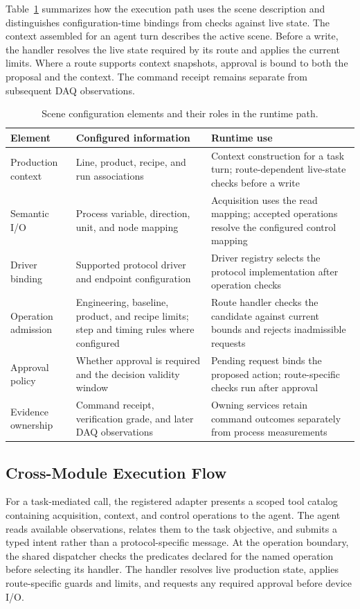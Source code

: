\documentclass[journal]{IEEEtran}
\begin{document}
Table~\ref{tab:scene-config} summarizes how the execution path uses the scene
description and distinguishes configuration-time bindings from checks against
live state. The context assembled for an agent turn describes the active scene. Before a
write, the handler resolves the live state required by its route and applies
the current limits. Where a route supports context snapshots, approval is
bound to both the proposal and the context. The command receipt remains
separate from subsequent DAQ observations.

\begin{table}[!t]
\centering
\caption{Scene configuration elements and their roles in the runtime path.}
\label{tab:scene-config}
\footnotesize
\setlength{\tabcolsep}{5pt}
\begin{tabularx}{\textwidth}{@{}>{\raggedright\arraybackslash}p{}>{\raggedright\arraybackslash}p{}X@{}}
\toprule
Element & Configured information & Runtime use\\
\midrule
Production context & Line, product, recipe, and run associations & Context construction for a task turn; route-dependent live-state checks before a write\\
Semantic I/O & Process variable, direction, unit, and node mapping & Acquisition uses the read mapping; accepted operations resolve the configured control mapping\\
Driver binding & Supported protocol driver and endpoint configuration & Driver registry selects the protocol implementation after operation checks\\
Operation admission & Engineering, baseline, product, and recipe limits; step and timing rules where configured & Route handler checks the candidate against current bounds and rejects inadmissible requests\\
Approval policy & Whether approval is required and the decision validity window & Pending request binds the proposed action; route-specific checks run after approval\\
Evidence ownership & Command receipt, verification grade, and later DAQ observations & Owning services retain command outcomes separately from process measurements\\
\bottomrule
\end{tabularx}
\end{table}

\subsection{Cross-Module Execution Flow}
\label{sec:executionflow}
For a task-mediated call, the registered adapter presents a scoped tool
catalog containing acquisition, context, and control operations to the agent.
The agent reads available observations, relates them to the task objective, and
submits a typed intent rather than a protocol-specific message. At the
operation boundary, the shared dispatcher checks the predicates declared for
the named operation before selecting its handler. The handler resolves live
production state, applies route-specific guards and limits, and requests any
required approval before device I/O.
\end{document}
